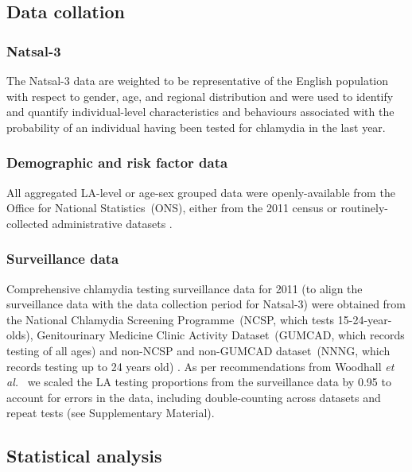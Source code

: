 \documentclass[fleqn,10pt]{wlscirep}
\begin{document}
\subsection*{Data collation}

\subsubsection*{Natsal-3}
The Natsal-3 data are weighted to be representative of the English population with respect to gender, age, and regional distribution \cite{Mercer2013,Erens2014b} and were used to identify and quantify individual-level characteristics and behaviours associated with the probability of an individual having been tested for chlamydia in the last year.

\subsubsection*{Demographic and risk factor data}
All aggregated LA-level or age-sex grouped data were openly-available from the Office for National Statistics~(ONS), either from the 2011 census \cite{ONS_cesnsusdata} or routinely-collected administrative datasets \cite{OfficeforNationalStatistics2011, OfficeforNationalStatistics2011a, DepartmentforCommunitiesandLocalGovernment, ONS_conceptions, ONS_urbanrural}.

\subsubsection*{Surveillance data}
Comprehensive chlamydia testing surveillance data for 2011 (to align the surveillance data with the data collection period for Natsal-3) were obtained from the National Chlamydia Screening Programme~(NCSP, which tests 15-24-year-olds), Genitourinary Medicine Clinic Activity Dataset~(GUMCAD, which records testing of all ages) and non-NCSP and non-GUMCAD dataset~(NNNG, which records testing up to 24 years old) \cite{PublicHealthEngland}. As per recommendations from Woodhall {\it et al.}~\cite{Woodhall2013} we scaled the LA testing proportions from the surveillance data by 0.95 to account for errors in the data, including double-counting across datasets and repeat tests (see Supplementary Material).

\subsection*{Statistical analysis}
\end{document}
